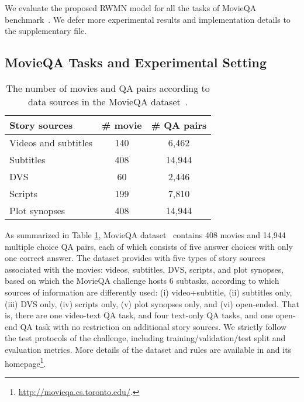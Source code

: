\documentclass[10pt,twocolumn,letterpaper]{article}
\theoremstyle{nonumberplain}
\begin{document}
We evaluate the proposed RWMN model for all the tasks of MovieQA benchmark~\cite{tapaswi2016movieqa}. 
We defer more experimental results and implementation details to the supplementary file.



\subsection{MovieQA Tasks and Experimental Setting}
\label{sec:movieqa_dataset}

\begin{table}[t]
\small
\begin{center}
\begin{tabular}{l|cc}
\hline
Story sources & \# movie & \# QA pairs \\
\hline
Videos and subtitles & 140 & 6,462 \\
Subtitles & 408 & 14,944 \\
DVS & 60 & 2,446\\
Scripts & 199 & 7,810\\ 
Plot synopses & 408 & 14,944 \\
\hline
\end{tabular}
\vspace{6pt}
\caption{The number of movies and QA pairs according to data sources in the MovieQA dataset~\cite{tapaswi2016movieqa}.}
\vspace{-13pt}
\label{tab:dataset}
\end{center}
\end{table}

As summarized in Table \ref{tab:dataset}, MovieQA dataset~\cite{tapaswi2016movieqa} contains 408 movies and 14,944 multiple choice QA pairs, each of which consists of five answer choices with only one correct answer.
The dataset provides with five types of story sources associated with the movies: videos, subtitles, DVS, scripts, and plot synopses, 
based on which the MovieQA challenge hosts 6 subtasks, according to which sources of information are differently used:
(i) video+subtitle, (ii) subtitles only, (iii) DVS only, (iv) scripts only, (v) plot synopses only, and (vi) open-ended. 
That is, there are one video-text QA task, and four text-only QA tasks, and one open-end QA task  with no restriction on additional story sources. 
We strictly follow the test protocols of the challenge, including training/validation/test split and evaluation metrics. 
More details of the dataset and rules are available in \cite{tapaswi2016movieqa} and its homepage\footnote{\url{http://movieqa.cs.toronto.edu/}.}.
\end{document}
